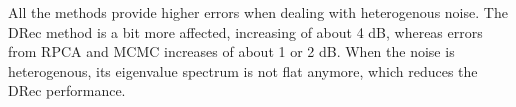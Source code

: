 \documentclass[fontsize=12pt,DIV13,paper=a4,abstract=true,titlepage=false]{scrartcl}
\begin{document}
%				
%		
%		 

All the methods provide higher errors when dealing with heterogenous noise. The DRec method is a bit more affected, increasing of about 4 dB, whereas errors from RPCA and MCMC increases of about 1 or 2 dB. When the noise is heterogenous, its eigenvalue spectrum is not flat anymore, which reduces the DRec performance.  
\end{document}
